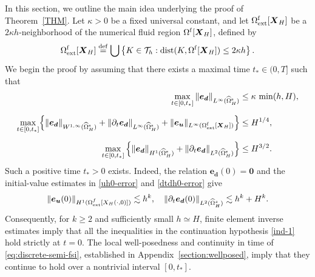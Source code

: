 \documentclass[11pt,reqno]{amsart}
\theoremstyle{definition}
\theoremstyle{plain}
\numberwithin{theorem}{section}
\numberwithin{proposition}{section}
\numberwithin{lemma}{section}
\numberwithin{equation}{section}
\newcommand{\bs}[1]{\boldsymbol{#1}}
\newcommand{\dep}{{{\bs{d}}}}
\renewcommand{\(}{\bigl(}
\renewcommand{\)}{\bigr)}
\def\eqd{\stackrel{\mathrm{def}}{=}}
\begin{document}
In this section, we outline the main idea underlying the proof of Theorem~\ref{THM}. Let $\kappa>0$ be a fixed universal constant, and let $\Omega^{\rm f}_{\rm ext}[\bs X_H] $ be a $2\kappa h$-neighborhood of the numerical fluid region $\Omega^{\rm f}[\bs X_H]$, defined by 
\begin{align}\label{Extended-region}
\Omega^{\rm f}_{\rm ext}[\bs X_H] \eqd \bigcup\left\{K\in {\mathcal T}_h: {\rm dist}(K,\Omega^{\rm f}[{\bs X}_H]) \le 2\kappa h\right\} . 
\end{align}
We begin the proof by assuming that there exists a maximal time $t_* \in(0,T]$  such that
\begin{subequations}\label{ind-1}
\begin{align}
\max_{t\in[0,t_*]}\|{\bs e}_\dep\|_{L^\infty(\widehat{\Omega}^{\rm s}_H)} &\le \kappa\,\min(h,H), \label{ind-1-1}\\[2mm]
\max_{t\in[0,t_*]}\!\left\{\|{\bs e}_\dep\|_{W^{1,\infty}(\widehat{\Omega}^{\rm s}_H)} + \|\partial_t{\bs e}_{\bs d}\|_{L^\infty(\widehat{\Omega}^{\rm s}_H)}
+ \|{\bs e}_{\bs u}\|_{L^\infty(\Omega^{\rm f}_{\rm ext}[\bs X_H])}  \right\} &\le H^{1/4}, \label{ind-1-2}\\[2mm]
\max_{t\in[0,t_*]}\left\{ \|{\bs e}_\dep\|_{H^1(\widehat{\Omega}^{\rm s}_H)} 
+\|\partial_t{\bs e}_\dep\|_{L^2(\widehat{\Omega}^{\rm s}_H)} \right\}&\le H^{3/2}. \label{ind-1-3}
\end{align}
\end{subequations}
Such a positive time $t_*>0$ exists. Indeed, the relation  ${\bs e}_{\bs d}(0)=\bs 0$ and the initial-value estimates in \eqref{uh0-error} and \eqref{dtdh0-error} give
$$
\|{\bs e}_{\bs u}(0)\|_{H^1(\Omega^f_{\rm ext}[X_H(\cdot,0)])}
\lesssim h^k, \quad 
\|\partial_t{\bs e}_{\bs d}(0)\|_{L^2(\widehat\Omega_H^s)}
\lesssim h^k+H^k. 
$$
Consequently, for $k\ge2$ and sufficiently small $h\simeq H$,
finite element inverse estimates imply that all the inequalities
in the continuation hypothesis \eqref{ind-1} hold strictly at $t=0$.
The local well-posedness and continuity in time of \eqref{eq:discrete-semi-fsi}, established in Appendix~\ref{section:wellposed},  imply that they continue to hold over a nontrivial interval $[0,t_*]$. 
\end{document}
